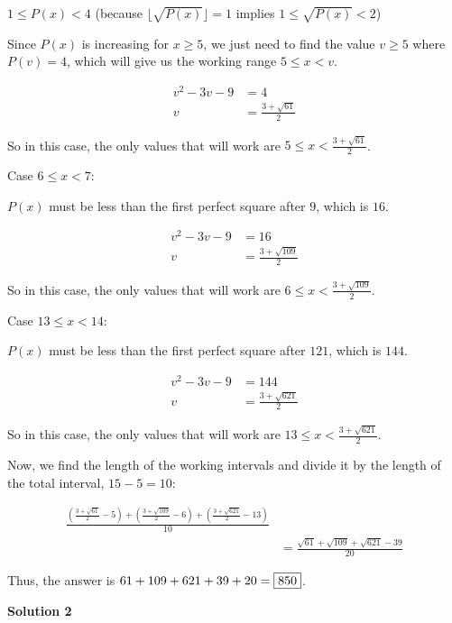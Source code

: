 \begin{enumerate}
 $1 \le P(x) < 4$ (because $\lfloor \sqrt{P(x)} \rfloor = 1$ implies $1 \le \sqrt{P(x)} < 2$)

 Since $P(x)$ is increasing for $x \ge 5$, we just need to find the value $v \ge 5$ where $P(v) = 4$, which will give us the working range $5 \le x < v$.

 
 \begin{align*} v^2 - 3v - 9 &= 4 \\ v &= \frac{3 + \sqrt{61}}{2} \end{align*}


 So in this case, the only values that will work are $5 \le x < \frac{3 + \sqrt{61}}{2}$.

 Case $6 \le x < 7$:

 $P(x)$ must be less than the first perfect square after $9$, which is $16$.

 
 \begin{align*} v^2 - 3v - 9 &= 16 \\ v &= \frac{3 + \sqrt{109}}{2} \end{align*}


 So in this case, the only values that will work are $6 \le x < \frac{3 + \sqrt{109}}{2}$.

 Case $13 \le x < 14$:

 $P(x)$ must be less than the first perfect square after $121$, which is $144$.

 
 \begin{align*} v^2 - 3v - 9 &= 144 \\ v &= \frac{3 + \sqrt{621}}{2} \end{align*}


 So in this case, the only values that will work are $13 \le x < \frac{3 + \sqrt{621}}{2}$.

 Now, we find the length of the working intervals and divide it by the length of the total interval, $15 - 5 = 10$:

 
 \begin{align*} \frac{\left( \frac{3 + \sqrt{61}}{2} - 5 \right) + \left( \frac{3 + \sqrt{109}}{2} - 6 \right) + \left( \frac{3 + \sqrt{621}}{2} - 13 \right)}{10} \\ &= \frac{\sqrt{61} + \sqrt{109} + \sqrt{621} - 39}{20} \end{align*}


 Thus, the answer is $61 + 109 + 621 + 39 + 20 = \fbox{850}$.

 



\textbf{Solution 2}


\end{enumerate}
